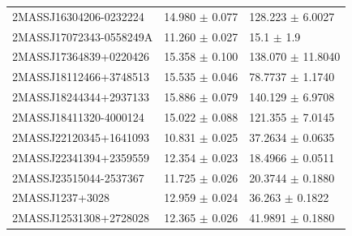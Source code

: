 \documentclass[11pt]{article}
\begin{document}
\begin{table}[htbp]
{\begin{tabular}{|l | l | l |}
2MASSJ16304206-0232224 & 14.980 $\pm$ 0.077 & 128.223 $\pm$ 6.0027\\
2MASSJ17072343-0558249A & 11.260 $\pm$ 0.027 & 15.1 $\pm$ 1.9\\
2MASSJ17364839+0220426 & 15.358 $\pm$ 0.100 & 138.070 $\pm$ 11.8040\\
2MASSJ18112466+3748513 & 15.535 $\pm$ 0.046 & 78.7737 $\pm$ 1.1740\\
2MASSJ18244344+2937133 & 15.886 $\pm$ 0.079 & 140.129 $\pm$ 6.9708\\
2MASSJ18411320-4000124 & 15.022 $\pm$ 0.088 & 121.355 $\pm$ 7.0145\\
2MASSJ22120345+1641093 & 10.831 $\pm$ 0.025 & 37.2634 $\pm$ 0.0635\\
2MASSJ22341394+2359559 & 12.354 $\pm$ 0.023 & 18.4966 $\pm$ 0.0511\\
2MASSJ23515044-2537367 & 11.725 $\pm$ 0.026 & 20.3744 $\pm$ 0.1880\\
2MASSJ1237+3028 & 12.959 $\pm$ 0.024 & 36.263 $\pm$ 0.1822\\
2MASSJ12531308+2728028 & 12.365 $\pm$ 0.026 & 41.9891 $\pm$ 0.1880\\
\hline
\end{tabular}
}
\end{table}
\end{document}
